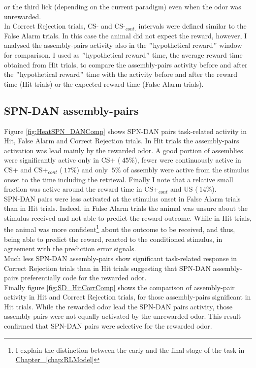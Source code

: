 or the third lick (depending on the current paradigm) even when the odor was unrewarded.\\In Correct Rejection trials, CS- and CS-$_{cont.}$ intervals were defined similar to the False Alarm trials. In this case the animal did not expect the reward, however, I analysed the assembly-pairs activity also in the $"$hypothetical reward$"$ window for comparison. I used as $"$hypothetical reward$"$ time, the average reward time obtained from Hit trials, to compare the assembly-pairs activity before and after the $"$hypothetical reward$"$ time with the activity before and after the reward time (Hit trials) or the expected reward time (False Alarm trials).

\subsection{SPN-DAN assembly-pairs}
Figure \ref{fig:HeatSPN_DANComp} shows SPN-DAN pairs task-related activity in Hit, False Alarm and Correct Rejection trials. In Hit trials the assembly-pairs activation was lead mainly by the rewarded odor. A good portion of assemblies were significantly active only in CS+ ($~ 45\%$), fewer were continuously active in CS+ and CS+$_{cont}$ ($~17\%$) and only $~5\%$ of assembly were active from the stimulus onset to the time including the retrieval. Finally I note that a relative small fraction was active around the reward time in CS+$_{cont}$ and US ($~ 14\%$).\\SPN-DAN pairs were less activated at the stimulus onset in False Alarm trials than in Hit trials. Indeed, in False Alarm trials the animal was unsure about the stimulus received and not able to predict the reward-outcome. While in Hit trials, the animal was more confident\footnote{I explain the distinction between the early and the final stage of the task in \hyperref[chap:RLModel]{Chapter ~\ref*{chap:RLModel}}} about the outcome to be received, and thus, being able to predict the reward, reacted to the conditioned stimulus, in agreement with the prediction error signals.\\Much less SPN-DAN assembly-pairs show significant task-related response in Correct Rejection trials than in Hit trials suggesting that SPN-DAN assembly-pairs preferentially code for the rewarded odor.\\Finally figure \ref{fig:SD_HitCorrComp} shows the comparison of assembly-pair activity in Hit and Correct Rejection trials, for those assembly-pairs significant in Hit trials. While the rewarded odor lead the SPN-DAN pairs activity, those assembly-pairs were not equally activated by the unrewarded odor. This result confirmed that SPN-DAN pairs were selective for the rewarded odor.
